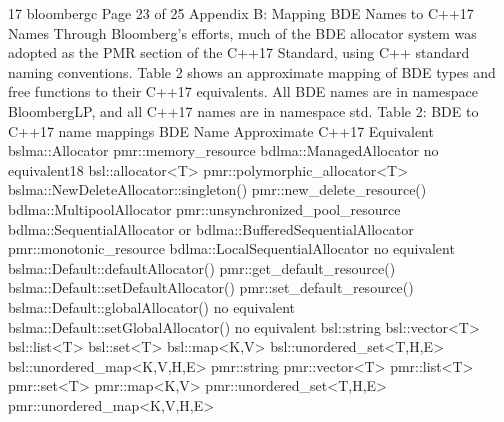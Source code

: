 17 bloombergc
Page 23 of 25
Appendix B: Mapping BDE Names to C++17 Names
Through Bloomberg’s efforts, much of the BDE allocator system was adopted
as the PMR section of the C++17 Standard, using C++ standard naming
conventions. Table 2 shows an approximate mapping of BDE types and free
functions to their C++17 equivalents. All BDE names are in namespace
BloombergLP, and all C++17 names are in namespace std.
Table 2: BDE to C++17 name mappings
BDE Name Approximate C++17 Equivalent
bslma::Allocator pmr::memory_resource
bdlma::ManagedAllocator no equivalent18
bsl::allocator<T> pmr::polymorphic_allocator<T>
bslma::NewDeleteAllocator::singleton() pmr::new_delete_resource()
bdlma::MultipoolAllocator pmr::unsynchronized_pool_resource
bdlma::SequentialAllocator or
bdlma::BufferedSequentialAllocator
pmr::monotonic_resource
bdlma::LocalSequentialAllocator no equivalent
bslma::Default::defaultAllocator() pmr::get_default_resource()
bslma::Default::setDefaultAllocator() pmr::set_default_resource()
bslma::Default::globalAllocator() no equivalent
bslma::Default::setGlobalAllocator() no equivalent
bsl::string
bsl::vector<T>
bsl::list<T>
bsl::set<T>
bsl::map<K,V>
bsl::unordered_set<T,H,E>
bsl::unordered_map<K,V,H,E>
pmr::string
pmr::vector<T>
pmr::list<T>
pmr::set<T>
pmr::map<K,V>
pmr::unordered_set<T,H,E>
pmr::unordered_map<K,V,H,E>

